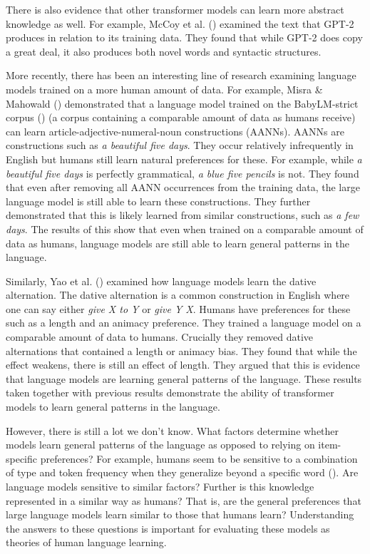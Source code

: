 \documentclass[
  12pt,
  letterpaper,
]{scrreprt}
\begin{document}
There is also evidence that other transformer models can learn more
abstract knowledge as well. For example, McCoy et al.
() examined the text that
GPT-2 produces in relation to its training data. They found that while
GPT-2 does copy a great deal, it also produces both novel words and
syntactic structures.

More recently, there has been an interesting line of research examining
language models trained on a more human amount of data. For example,
Misra \& Mahowald ()
demonstrated that a language model trained on the BabyLM-strict corpus
() (a corpus containing a comparable amount of data as humans
receive) can learn article-adjective-numeral-noun constructions (AANNs).
AANNs are constructions such as \emph{a beautiful five days}. They occur
relatively infrequently in English but humans still learn natural
preferences for these. For example, while \emph{a beautiful five days}
is perfectly grammatical, \emph{a blue five pencils} is not. They found
that even after removing all AANN occurrences from the training data,
the large language model is still able to learn these constructions.
They further demonstrated that this is likely learned from similar
constructions, such as \emph{a few days}. The results of this show that
even when trained on a comparable amount of data as humans, language
models are still able to learn general patterns in the language.

Similarly, Yao et al. ()
examined how language models learn the dative alternation. The dative
alternation is a common construction in English where one can say either
\emph{give X to Y} or \emph{give Y X}. Humans have preferences for these
such as a length and an animacy preference. They trained a language
model on a comparable amount of data to humans. Crucially they removed
dative alternations that contained a length or animacy bias. They found
that while the effect weakens, there is still an effect of length. They
argued that this is evidence that language models are learning general
patterns of the language. These results taken together with previous
results demonstrate the ability of transformer models to learn general
patterns in the language.

However, there is still a lot we don't know. What factors determine
whether models learn general patterns of the language as opposed to
relying on item-specific preferences? For example, humans seem to be
sensitive to a combination of type and token frequency when they
generalize beyond a specific word
().
Are language models sensitive to similar factors? Further is this
knowledge represented in a similar way as humans? That is, are the
general preferences that large language models learn similar to those
that humans learn? Understanding the answers to these questions is
important for evaluating these models as theories of human language
learning.
\end{document}
